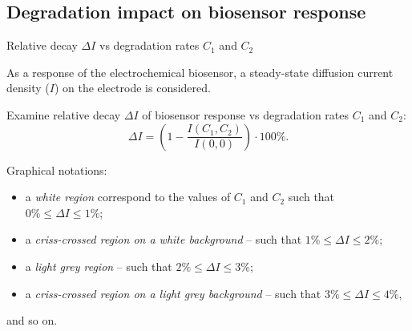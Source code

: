 \documentclass[hyperref={breaklinks=true},fleqn,mathserif]{beamer}
\begin{document}

\subsection{Degradation impact on biosensor response}

\begin{frame}[shrink=11]{Relative decay $\Delta I$ vs degradation rates $C_1$ and $C_2$}

\begin{exampleblock}{}
As a response of the electrochemical biosensor, a steady-state diffusion current density ($I$) on the electrode is considered.
\end{exampleblock}

Examine relative decay $\Delta I$ of biosensor response vs degradation rates $C_1$ and $C_2$:
\[
    \Delta I  =  \left( 1 - \frac{I\left( C_1, C_2 \right)}{I\left( 0, 0 \right)} \right) \cdot 100\%.
\]

\pause
\vspace*{-2mm}
\begin{block}{Graphical notations:}
\begin{itemize}

\item
a \emph{white region} correspond to the values of $C_1$ and $C_2$ such that $0\% \leqslant \Delta I \leqslant 1\%$;

\item
a \emph{criss-crossed region on a white background} -- such that $1\% \leqslant \Delta I \leqslant 2\%$;

\item
a \emph{light grey region} -- such that $2\% \leqslant \Delta I \leqslant 3\%$;

\item
a \emph{criss-crossed region on a light grey background} -- such that $3\% \leqslant \Delta I \leqslant 4\%$,

\end{itemize}
and so on.
\end{block}

\end{frame}
\end{document}
